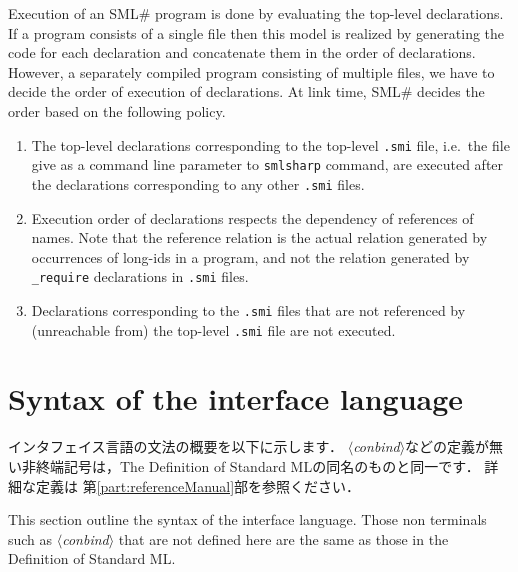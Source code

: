 \documentclass{jbook}
\newcommand{\txt}[2]{#2}
\newcommand{\smlsharp}{SML\#}
\newcommand{\nonterm}[1]{\mbox{$\langle$}{\it #1}\mbox{$\rangle$}}
\begin{document}
\else%
	Execution of an \smlsharp{} program is done by evaluating the
top-level declarations.
	If a program consists of a single file then this model is
realized by generating the code for each declaration and concatenate
them in the order of declarations.
	However, a separately compiled program consisting of multiple
files, we have to decide the order of execution of declarations.
	At link time, \smlsharp{} decides the order based on the
following policy.
\begin{enumerate}
\item
	The top-level declarations corresponding to the top-level {\tt .smi} file,
i.e.\ the file give as a command line parameter to {\tt smlsharp} command, are
executed after the declarations corresponding to any other {\tt .smi} files.

\item
	Execution order of declarations respects the dependency of
references of names.
	Note that the reference relation is the actual relation
generated by occurrences of long-ids in a program, and not the 
relation generated by {\tt\_require} declarations in {\tt .smi} files.
\item
	Declarations corresponding to the {\tt .smi} files 
that are not referenced by (unreachable from) the top-level {\tt .smi}
file are not executed.
\end{enumerate}

\fi%

\section{\txt{インタフェイス言語の文法}{Syntax of the interface language}}
\label{sec:tutorialInterfaceSyntax}

\ifjp%
	インタフェイス言語の文法の概要を以下に示します．
	\nonterm{conbind}などの定義が無い非終端記号は，The Definition of
Standard MLの同名のものと同一です．
	詳細な定義は
第\ref{part:referenceManual}部を参照ください．

\else%
	This section outline the syntax of the interface language.
	Those non terminals such as \nonterm{conbind} that are not
defined here are the same as those in the Definition of Standard ML.
\fi%
\end{document}

